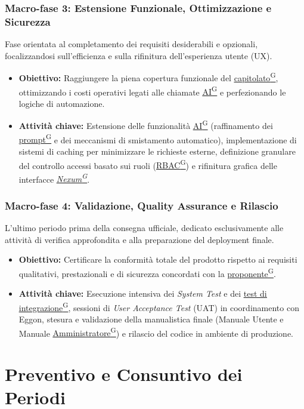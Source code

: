 \documentclass[a4paper,12pt]{article}
\providecommand{\glslink}[2]{\href{https://alittlebyte-19.github.io/Documentazione/glossario.html\#gls-#1}{\underline{#2}\textsuperscript{\scriptsize G}}}
\begin{document}
\subsubsection{Macro-fase 3: Estensione Funzionale, Ottimizzazione e Sicurezza}
Fase orientata al completamento dei requisiti desiderabili e opzionali, focalizzandosi sull'efficienza e sulla rifinitura dell'esperienza utente (UX).
\begin{itemize}
    \item \textbf{Obiettivo:} Raggiungere la piena copertura funzionale del \glslink{capitolato}{capitolato}, ottimizzando i costi operativi legati alle chiamate \glslink{intelligenza-artificiale-ai}{AI} e perfezionando le logiche di automazione.
    \item \textbf{Attività chiave:} Estensione delle funzionalità \glslink{intelligenza-artificiale-ai}{AI} (raffinamento dei \glslink{prompt}{prompt} e dei meccanismi di smistamento automatico), implementazione di sistemi di caching per minimizzare le richieste esterne, definizione granulare del controllo accessi basato sui ruoli (\glslink{rbac-role-based-access-control}{RBAC}) e rifinitura grafica delle interfacce \textit{\glslink{nexum}{Nexum}}.
\end{itemize}

\subsubsection{Macro-fase 4: Validazione, Quality Assurance e Rilascio}
L'ultimo periodo prima della consegna ufficiale, dedicato esclusivamente alle attività di verifica approfondita e alla preparazione del deployment finale.
\begin{itemize}
    \item \textbf{Obiettivo:} Certificare la conformità totale del prodotto rispetto ai requisiti qualitativi, prestazionali e di sicurezza concordati con la \glslink{committente-proponente}{proponente}.
    \item \textbf{Attività chiave:} Esecuzione intensiva dei \textit{System Test} e dei \glslink{test-di-integrazione}{test di integrazione}, sessioni di \textit{User Acceptance Test} (UAT) in coordinamento con Eggon, stesura e validazione della manualistica finale (Manuale Utente e Manuale \glslink{amministratore}{Amministratore}) e rilascio del codice in ambiente di produzione.
\end{itemize}

\newpage
\section{Preventivo e Consuntivo dei Periodi}
\label{sec:preventivo_e_consuntivo}
\end{document}
